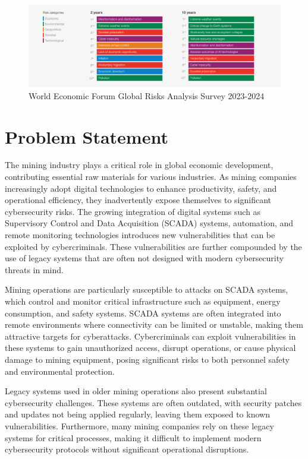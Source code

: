 \documentclass[a4paper,twoside,12pt]{report}
\begin{document}
\begin{figure}[ht]
    \centering
    \includegraphics[width=1.0\linewidth]{images/world-economic-forum-global-risks.png}  %
    \caption{World Economic Forum Global Risks Analysis Survey 2023-2024}
    \label{fig:thing11}
\end{figure}

\section{Problem Statement}

The mining industry plays a critical role in global economic development, contributing essential raw materials for various industries. As mining companies increasingly adopt digital technologies to enhance productivity, safety, and operational efficiency, they inadvertently expose themselves to significant cybersecurity risks. The growing integration of digital systems such as Supervisory Control and Data Acquisition (SCADA) systems, automation, and remote monitoring technologies introduces new vulnerabilities that can be exploited by cybercriminals. These vulnerabilities are further compounded by the use of legacy systems that are often not designed with modern cybersecurity threats in mind. 

Mining operations are particularly susceptible to attacks on SCADA systems, which control and monitor critical infrastructure such as equipment, energy consumption, and safety systems. SCADA systems are often integrated into remote environments where connectivity can be limited or unstable, making them attractive targets for cyberattacks. Cybercriminals can exploit vulnerabilities in these systems to gain unauthorized access, disrupt operations, or cause physical damage to mining equipment, posing significant risks to both personnel safety and environmental protection.

Legacy systems used in older mining operations also present substantial cybersecurity challenges. These systems are often outdated, with security patches and updates not being applied regularly, leaving them exposed to known vulnerabilities. Furthermore, many mining companies rely on these legacy systems for critical processes, making it difficult to implement modern cybersecurity protocols without significant operational disruptions.
\end{document}
